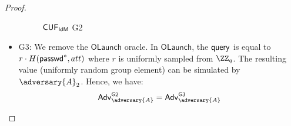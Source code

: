 \begin{proof}
\begin{itemize}
\begin{figure*}
{\begin{pchstack}[center, space=0.2cm, boxed]
\begin{pcvstack}
    \end{pcvstack}
    \begin{pcvstack}
    \end{pcvstack}
    \end{pchstack}
}
\caption{$\mathsf{CUF}_{\textsf{IdM}}$ \textsf{G2}}
\label{game:cuf_idmg2}
\end{figure*}

        \item \textsf{G3}: We remove the $\mathsf{OLaunch}$ oracle. In $\mathsf{OLaunch}$, the $\mathsf{query}$ is equal to $r\cdot H(\textsf{passwd}^*, att)$ where $r$ is uniformly sampled from $\ZZ_q$. The resulting value (uniformly random group element) can be simulated by $\adversary{A}_2$. Hence, we have:
        \begin{align*}
            \advtg_\adversary{A}^{\mathsf{G2}} = \advtg_\adversary{A}^{\mathsf{G3}} 
        \end{align*}


\end{itemize}
\end{proof}
